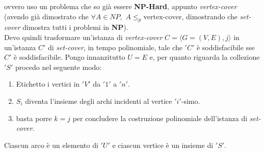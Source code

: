							ovvero uso un problema che so già essere \textbf{NP-Hard}, appunto
							\textit{vertex-cover} (avendo già dimostrato che $\forall A\in NP, \,\,A\leq_p
							\mbox{vertex-cover}$, dimostrando che \textit{set-cover} dimostra tutti i
							problemi in \textbf{NP}).\\
							Devo quindi trasformare un'istanza di \textit{vertex-cover} $C=\langle
							G=(V,E), j\rangle$ in un'istanza $C'$ di \textit{set-cover}, in tempo
							polinomiale, tale che $ 'C' $ è soddisfacibile sse $C'$ è soddisfacibile. Pongo innanzitutto $U=E$ e, per quanto riguarda la collezione $ 'S' $ procedo nel seguente modo:
							\begin{enumerate}
								\item Etichetto i vertici in
								      $ 'V' $ da $ '1' $ a $ 'n' $.
								\item   $S_i$ diventa l'insieme degli archi incidenti
								      al vertice $ 'i' $-simo.
								\item   basta porre $k=j$ per concludere la costruzione polinomiale dell'istanza di \textit{set-cover}.\\
							\end{enumerate}
							\begin{nota}
								Ciascun arco è un elemento di $ 'U' $ e ciascun vertice è un
								insieme di $ 'S' $.\\
							\end{nota}

